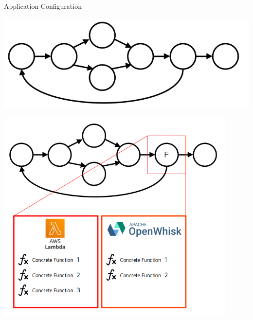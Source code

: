 \documentclass[13.5pt]{beamer}
\begin{document}

\begin{frame}{Application Configuration}
	
	\begin{center}
		\includegraphics[width=\textwidth,height=0.45\textheight]{../Images/ExampleSlide1.png}
	\end{center}
	
\end{frame} 

\begin{frame}[noframenumbering]
	
	\begin{center}
		\includegraphics[width=0.9\textwidth,height=0.95\textheight]{../Images/ExampleSlide2.png}
	\end{center}
	
\end{frame} 
\end{document}
